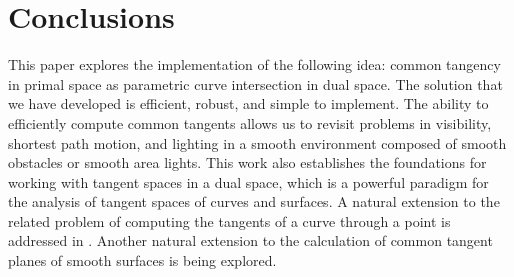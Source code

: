 \documentclass[9pt,twocolumn]{article}
\newif\ifJournal
\newcommand{\tang}{tangential curve\ }
\begin{document}
\ifJournal
Additional sections: computing from a point; size of visibility graph.
\fi

\section{Conclusions}
\label{sec:conclude}

This paper explores the implementation of the following idea:
common tangency in primal space as parametric curve intersection in dual space.
The solution that we have developed is efficient, robust, and simple to implement.
The ability to efficiently compute common tangents
allows us to revisit problems in visibility, shortest path motion, and lighting
in a smooth environment composed of smooth obstacles or smooth area lights.
This work also establishes the foundations for
working with tangent spaces in a dual space, which is a powerful
paradigm for the analysis of tangent spaces of curves and surfaces.
A natural extension to
the related problem of computing the tangents of a curve through a point
is addressed in \cite{jj00pole}.
Another natural extension to the calculation of common tangent planes of 
smooth surfaces is being explored.

%
\end{document}
